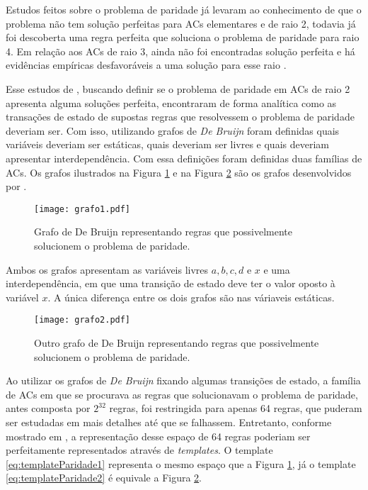 Estudos feitos sobre o problema de paridade já levaram ao conhecimento de que o problema não tem solução perfeitas para ACs elementares e de raio 2, todavia já foi descoberta uma regra perfeita que soluciona o problema de paridade para raio 4. Em relação aos ACs de raio 3, ainda não foi encontradas solução perfeita e há evidências empíricas desfavoráveis a uma solução para esse raio \cite{Betel2013}.

Esse estudos de , buscando definir se o problema de paridade em ACs de raio 2 apresenta alguma soluções perfeita, encontraram de forma analítica como as transações de estado de supostas regras que resolvessem o problema de paridade deveriam ser. Com isso, utilizando grafos de \textit{De Bruijn} foram definidas quais variáveis deveriam ser estáticas, quais deveriam ser livres e quais deveriam apresentar interdependência. Com essa definições foram definidas duas famílias de ACs. Os grafos ilustrados na Figura \ref{fig:grafosDeBruijn} e na Figura \ref{fig:grafosDeBruijn2} são os grafos desenvolvidos por .

\begin{figure}[h!]
  \centering
  \texttt{[image: grafo1.pdf]}
    \caption{Grafo de De Bruijn representando regras que possivelmente solucionem o problema de paridade.}
    \label{fig:grafosDeBruijn}
\end{figure}

Ambos os grafos apresentam as variáveis livres $a, b, c, d \text{ e } x$ e uma interdependência, em que uma transição de estado deve ter o valor oposto à variável $x$. A única diferença entre os dois grafos são nas váriaveis estáticas.

\begin{figure}[h!]
  \centering
  \texttt{[image: grafo2.pdf]}
    \caption{Outro grafo de De Bruijn representando regras que possivelmente solucionem o problema de paridade.}
    \label{fig:grafosDeBruijn2}
\end{figure}

Ao utilizar os grafos de \textit{De Bruijn} fixando algumas transições de estado, a família de ACs em que se procurava as regras que solucionavam o problema de paridade, antes composta por $2^{32}$ regras, foi restringida para apenas 64 regras, que puderam ser estudadas em mais detalhes até que se falhassem. Entretanto, conforme mostrado em \cite{daCosta2014}, a representação desse espaço de 64 regras poderiam ser perfeitamente representados através de \textit{templates}. O template \ref{eq:templateParidade1} representa o mesmo espaço que a Figura \ref{fig:grafosDeBruijn}, já o template \ref{eq:templateParidade2} é equivale a Figura \ref{fig:grafosDeBruijn2}.

